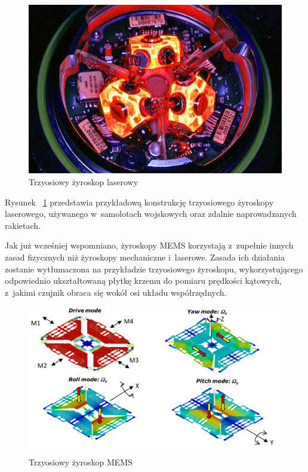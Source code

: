 \documentclass[11pt, twoside]{Thesis} %
\begin{document}
\begin{figure}[H]
	\centering
	\includegraphics[scale=0.4]{Pictures/3d_laser_ring_gyro.jpg}
        \caption[Trzyosiowy żyroskop laserowy]{Trzyosiowy żyroskop laserowy~\cite{mems7}}
        \label{fig:3d_laser_ring_gyro}
\end{figure}

Rysunek ~\ref{fig:3d_laser_ring_gyro} przedstawia przykładową konstrukcję trzyosiowego żyroskopy laserowego, używanego w~samolotach wojskowych oraz zdalnie naprowadzanych rakietach. 

Jak już wcześniej wspomniano, żyroskopy MEMS korzystają z~zupełnie innych zasad fizycznych niż żyroskopy mechaniczne i~laserowe. Zasada ich działania zostanie wytłumaczona na przykładzie trzyosiowego żyroskopu, wykorzystującego odpowiednio ukształtowaną płytkę krzemu do pomiaru prędkości kątowych, z~jakimi czujnik obraca się wokół osi układu współrzędnych.

\begin{figure}[H]
	\centering
	\includegraphics[scale=0.4]{Pictures/3d_gyro.png}
        \caption[Trzyosiowy żyroskop MEMS]{Trzyosiowy żyroskop MEMS~\cite{mems6}}
        \label{fig:3d_gyro}
\end{figure}
\end{document}
